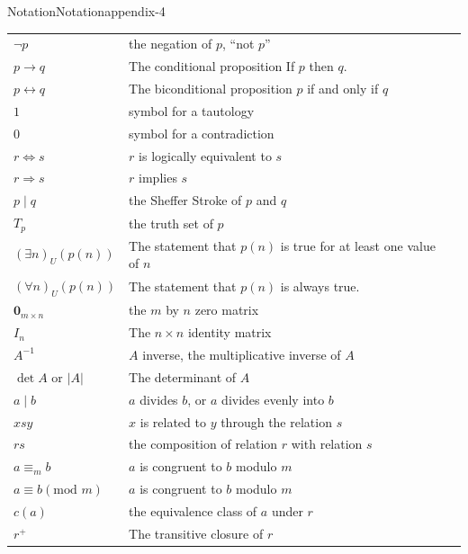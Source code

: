 \documentclass[twoside,10pt,]{book}
\numberwithin{equation}{section}
\begin{document}
\begin{appendixptx}{Notation}{}{Notation}{}{}{appendix-4}
\begin{longtable}[l]{lp{}r}
\(\neg p\)&the negation of \(p\), ``not \(p\)''&\pageref{notation-17}\\
\(p \to  q\)&The conditional proposition If \(p\) then \(q\).&\pageref{notation-18}\\
\( p \leftrightarrow q\)&The biconditional proposition \(p\) if and only if \(q\)&\pageref{notation-19}\\
\(1\)&symbol for a tautology&\pageref{notation-20}\\
\(0\)&symbol for a contradiction&\pageref{notation-21}\\
\( r \iff s\)&\(r\) is logically equivalent to \(s\)&\pageref{notation-22}\\
\(r \Rightarrow  s\)&\(r\) implies \(s\)&\pageref{notation-23}\\
\(p \mid q\)&the Sheffer Stroke of \(p\) and \(q\)&\pageref{notation-24}\\
\(T_p\)&the truth set of \(p\)&\pageref{notation-25}\\
\((\exists  n)_U(p(n))\)&The statement that \(p(n)\) is true for at least one value of \(n\)&\pageref{notation-26}\\
\((\forall n)_U(p(n))\)&The statement that \(p(n)\) is always true.&\pageref{notation-27}\\
\(\pmb{0}_{m\times n}\)&the \(m\) by \(n\) zero matrix&\pageref{notation-28}\\
\( I_{n}\)&The \(n \times n\) identity matrix&\pageref{notation-29}\\
\(A^{-1}\)&\(A\) inverse, the multiplicative inverse of \(A\)&\pageref{notation-30}\\
\(\det A\textrm{ or }\lvert A \rvert\)&The determinant of \(A\)&\pageref{notation-31}\\
\(a \mid b\)&\(a\) divides \(b\), or \(a\) divides evenly into \(b\)&\pageref{notation-32}\\
\(x s y\)&\(x\) is related to \(y\) through the relation \(s\)&\pageref{notation-33}\\
\(r s\)&the composition of relation \(r\) with relation \(s\)&\pageref{notation-34}\\
\(a \equiv_m b\)&\(a\) is congruent to \(b\) modulo \(m\)&\pageref{notation-35}\\
\(a \equiv b (\textrm{mod } m)\)&\(a\) is congruent to \(b\) modulo \(m\)&\pageref{notation-36}\\
\(c(a)\)&the equivalence class of \(a\) under \(r\)&\pageref{notation-37}\\
\(r^+\)&The transitive closure of \(r\)&\pageref{notation-38}\\

\end{longtable}
\end{appendixptx}
\end{document}
